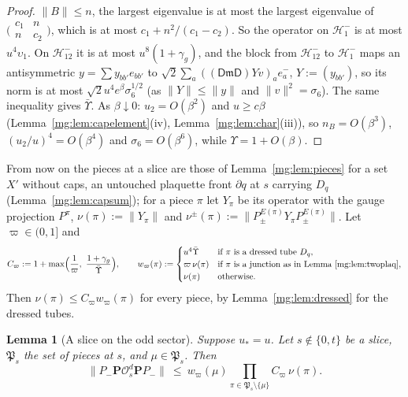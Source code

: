 \documentclass[11pt,a4paper]{article}
\newtheorem{lemma}[theorem]{Lemma}
\theoremstyle{definition}
\theoremstyle{remark}
\newcommand{\norm}[1]{\lVert #1\rVert}
\begin{document}
\begin{proof}
$\norm B\le n$, the largest eigenvalue is at most the largest eigenvalue of $\bigl(\begin{smallmatrix}c_1&n\\n&c_2\end{smallmatrix}\bigr)$, which is at most $c_1+n^2/(c_1-c_2)$.
So the operator on $\mathcal H_1^-$ is at most $u^4\upsilon_1$. On $\mathcal H_{12}^-$ it is at most $u^8(1+\gamma_g)$, and the block from $\mathcal H_{12}^-$ to $\mathcal H_1^-$
maps an antisymmetric $y=\sum y_{bb'}e_{bb'}$ to $\sqrt2\sum_a((\mathsf D\mathfrak m\mathsf D)Yv)_ae^-_a$, $Y:=(y_{bb'})$, so its norm is at most $\sqrt2u^4e^\beta\sigma_6^{1/2}$
(as $\norm Y\le\norm y$ and $\norm v^2=\sigma_6$). The same inequality gives $\bar\Upsilon$. As $\beta\downarrow0$: $u_2=O(\beta^2)$ and $u\ge c\beta$
(Lemma~\ref{mg:lem:capelement}(iv), Lemma~\ref{mg:lem:char}(iii)), so $n_B=O(\beta^3)$, $(u_2/u)^4=O(\beta^4)$ and $\sigma_6=O(\beta^6)$, while
$\Upsilon=1+O(\beta)$.
\end{proof}

From now on the pieces at a slice are those of Lemma~\ref{mg:lem:pieces} for a set $X'$ without caps, an untouched plaquette front $\partial q$ at $s$
carrying $D_q$ (Lemma~\ref{mg:lem:capsum}); for a piece $\pi$ let $Y_\pi$ be its operator with the gauge projection $P^\pi$, $\nu(\pi):=\norm{Y_\pi}$ and
$\nu^\pm(\pi):=\norm{P^{E(\pi)}_\pm Y_\pi P^{E(\pi)}_\pm}$. Let $\varpi\in(0,1]$ and
\[
C_\varpi:=1+\max\Bigl(\frac1\varpi,\ \frac{1+\gamma_g}{\bar\Upsilon}\Bigr),\qquad w_\varpi(\pi):=\begin{cases}u^4\bar\Upsilon&\text{if $\pi$ is a dressed tube $D_q$},\\
\varpi\,\nu(\pi)&\text{if $\pi$ is a junction as in Lemma~\ref{mg:lem:twoplaq}},\\ \nu(\pi)&\text{otherwise}.\end{cases}
\]
Then $\nu(\pi)\le C_\varpi w_\varpi(\pi)$ for every piece, by Lemma~\ref{mg:lem:dressed} for the dressed tubes.

\begin{lemma}[A slice on the odd sector]\label{mg:lem:oddslice}
Suppose $u_*=u$. Let $s\notin\{0,t\}$ be a slice, $\mathfrak P_s$ the set of pieces at $s$, and $\mu\in\mathfrak P_s$. Then
\[
\norm{P_-\mathbf P\mathcal O^d_s\mathbf PP_-}\ \le\ w_\varpi(\mu)\prod_{\pi\in\mathfrak P_s\setminus\{\mu\}}C_\varpi\,\nu(\pi).
\]
\end{lemma}
\end{document}

